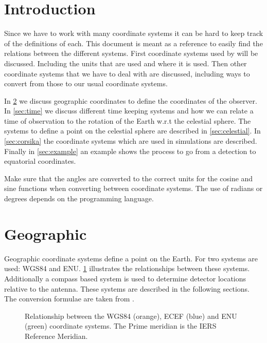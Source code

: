 \section{Introduction}

Since we have to work with many coordinate systems it can be hard to
keep track of the definitions of each. This document is meant as a
reference to easily find the relations between the different systems.
First coordinate systems used by \hisparc will be discussed. Including
the units that are used and where it is used. Then other coordinate
systems that we have to deal with are discussed, including ways to
convert from those to our usual coordinate systems.

In \cref{sec:geographic} we discuss geographic coordinates to define
the coordinates of the observer. In \cref{sec:time} we discuss
different time keeping systems and how we can relate a time of
observation to the rotation of the Earth w.r.t the celestial sphere. The
systems to define a point on the celestial sphere are described in
\cref{sec:celestial}. In \cref{sec:corsika} the coordinate systems
which are used in \corsika simulations are described. Finally in
\cref{sec:example} an example shows the process to go from a \hisparc
detection to equatorial coordinates.

Make sure that the angles are converted to the correct units for the
cosine and sine functions when converting between coordinate systems.
The use of radians or degrees depends on the programming language.


\section{Geographic}
\label{sec:geographic}

Geographic coordinate systems define a point on the Earth. For \hisparc
two systems are used: WGS84 and ENU. \cref{fig:wgs84_ecef_enu}
illustrates the relationships between these systems. Additionally a
compass based system is used to determine detector locations relative to
the \gps antenna. These systems are described in the following sections.
The conversion formulae are taken from \cite[sec.~K]{usno:2014aa}.

\begin{figure}
    \centering
    
    \caption{Relationship between the WGS84 (orange), ECEF (blue) and ENU
             (green) coordinate systems. The Prime meridian is the IERS
             Reference Meridian.}
    \label{fig:wgs84_ecef_enu}
\end{figure}


